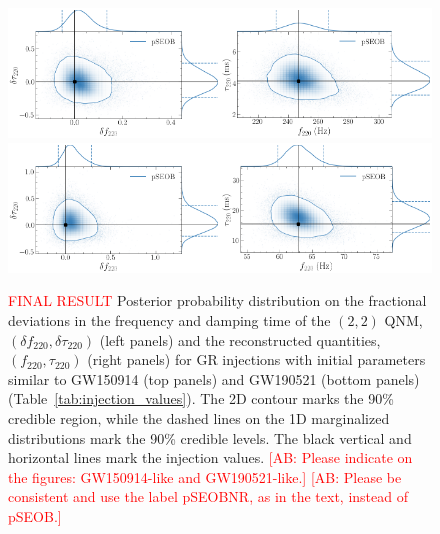 \documentclass[twocolumn,prd,aps,superscriptaddress,preprintnumbers,tightenlines,showpacs,nofootinbib,eqsecnum,amsfonts,amsmath]{revtex4-1}
\newcommand{\comment}[1]{\textcolor{red}{[#1]}}
\newcommand{\df}[1]{\delta f_{\text{#1}}}
\newcommand{\dtau}[1]{\delta \tau_{\text{#1}}}
\newcommand{\fngr}[1]{f_{\text{#1}}}
\newcommand{\taungr}[1]{\tau_{\text{#1}}}
\begin{document}
\begin{figure}[hbt]
\begin{center}
	\includegraphics[width=0.5\textwidth]{figures/GW150914_simulated_signal_0p0_deltaf220_deltatau220.png}\includegraphics[width=0.5\textwidth]{figures/GW150914_simulated_signal_0p0_f220_tau220.png}	
	\includegraphics[width=0.5\textwidth]{figures/GW190521_simulated_signal_0p0_deltaf220_deltatau220.png}\includegraphics[width=0.5\textwidth]{figures/GW190521_simulated_signal_0p0_f220_tau220.png}		
	\caption{\textcolor{red}{FINAL RESULT} Posterior probability distribution on the fractional deviations in the frequency and damping time of the $(2,2)$ QNM, $(\df{220},\dtau{220})$ (left panels) and the reconstructed quantities, $(\fngr{220}, \taungr{220})$ (right panels) for GR injections with initial parameters similar to GW150914 (top panels) and GW190521 (bottom panels) (Table~\ref{tab:injection_values}). The 2D contour marks the 90\% credible region, while the dashed lines on the 1D marginalized distributions mark the 90\% credible levels. The black vertical and horizontal lines mark the injection values. \comment{AB: Please indicate on the figures: GW150914-like and GW190521-like.} \comment{AB: Please be consistent and use the label pSEOBNR, as in the text, instead of pSEOB.}}
	\label{fig:simulated_signal_GR}
\end{center}
\end{figure}
\end{document}
